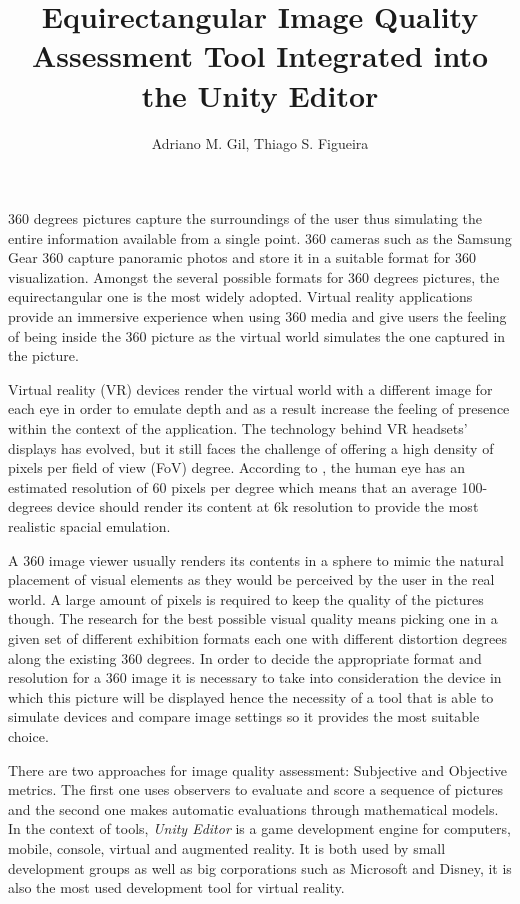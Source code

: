 \documentclass[12pt]{article}
\title{Equirectangular Image Quality Assessment Tool Integrated into the Unity Editor}
\author{Adriano M. Gil\inst{1}, Thiago S. Figueira\inst{1}}
\begin{document}
\maketitle

360 degrees pictures capture the surroundings of the user thus simulating the entire information available from a single point. 360 cameras such as the Samsung Gear 360 capture panoramic photos and store it in a suitable format for 360 visualization. Amongst the several possible formats for 360 degrees pictures, the equirectangular one is the most widely adopted. Virtual reality applications provide an immersive experience when using 360 media and give users the feeling of being inside the 360 picture as the virtual world simulates the one captured in the picture.

Virtual reality (VR) devices render the virtual world with a different image for each eye in order to emulate depth and as a result increase the feeling of presence within the context of the application. The technology behind VR headsets' displays has evolved, but it still faces the challenge of offering a high density of pixels per field of view (FoV) degree. According to \cite{va1965visual}, the human eye has an estimated resolution of 60 pixels per degree which means that an average 100-degrees device should render its content at 6k resolution to provide the most realistic spacial emulation.

A 360 image viewer usually renders its contents in a sphere to mimic the natural placement of visual elements as they would be perceived by the user in the real world. A large amount of pixels is required to keep the quality of the pictures though. The research for the best possible visual quality means picking one in a given set of different exhibition formats each one with different distortion degrees along the existing 360 degrees. In order to decide the appropriate format and resolution for a 360 image it is necessary to take into consideration the device in which this picture will be displayed hence the necessity of a tool that is able to simulate devices and compare image settings so it provides the most suitable choice.

There are two approaches for image quality assessment: Subjective  and Objective metrics. The first one uses observers to evaluate and score a sequence of pictures and the second one makes automatic evaluations through mathematical models. In the context of tools, \textit{Unity Editor} is a game development engine for computers, mobile, console, virtual and augmented reality. It is both used by small development groups as well as big corporations such as Microsoft and Disney, it is also the most used development tool for virtual reality.
\end{document}
